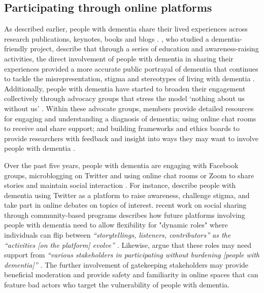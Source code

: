 \subsection{Participating through online platforms}
\label{PD:onlinePlatform}
As described earlier, people with dementia share their lived experiences across research publications, keynotes, books and blogs \citep{bryden_challenging_2020, shakespeare_rights_2019}. \cite{phillipson2019involvement}, who studied a dementia-friendly project, describe that through a series of education and awareness-raising activities, the direct involvement of people with dementia in sharing their experiences provided a more accurate public portrayal of dementia that continues to tackle the misrepresentation, stigma and stereotypes of living with dementia \citep{herrmann_systematic_2018}. Additionally, people with dementia have started to broaden their engagement collectively through advocacy groups that stress the model `nothing about us without us' \citep{oldfield2021nothing}. Within these advocate groups, members provide detailed resources for engaging and understanding a diagnosis of dementia; using online chat rooms to receive and share support; and building frameworks and ethics boards to provide researchers with feedback and insight into ways they may want to involve people with dementia \citep{davies2021dementia}.

Over the past five years, people with dementia are engaging with Facebook groups, microblogging on Twitter and using online chat rooms or Zoom to share stories and maintain social interaction \citep{lazar_safe_2019}. For instance, \cite{talbot_how_2020} describe people with dementia using Twitter as a platform to raise awareness, challenge stigma, and take part in online debates on topics of interest. \cite{dai2020making} recent work on social sharing through community-based programs describes how future platforms involving people with dementia need to allow flexibility for "dynamic roles" where individuals can flip between \textit{``storytellings, listeners, contributors'' as the ``activities [on the platform] evolve'' \citep[pg. 10]{dai2020making}}. Likewise, \cite{johnson2020roles} argue that these roles may need support from \textit{``various stakeholders in participating without burdening [people with dementia]'' \citep[pg. 127]{johnson2020roles}}. The further involvement of gatekeeping stakeholders may provide beneficial moderation and provide safety and familiarity in online spaces that can feature bad actors who target the vulnerability of people with dementia. 

